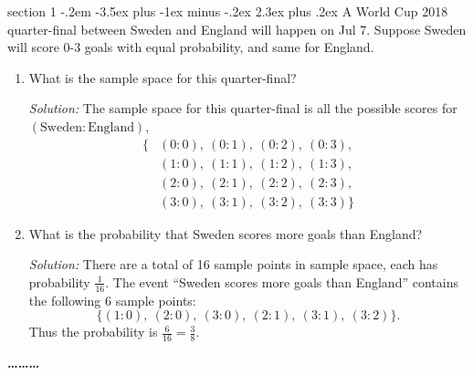 \documentclass[11pt]{article}
\makeatletter
\newenvironment{problem}{\@startsection
       {section}
       {1}
       {-.2em}
       {-3.5ex plus -1ex minus -.2ex}
       {2.3ex plus .2ex}
       {\pagebreak[3]%
       \large\bf\noindent{Problem }
       }
       }
       {%
       \begin{center}\large\bf \ldots\ldots\ldots\end{center}}
\makeatother
\begin{document}
\begin{problem}{}
A World Cup 2018 quarter-final between Sweden and England will happen on Jul 7. Suppose Sweden will score 0-3 goals with equal probability, and same for England. 
\begin{enumerate}
\item What is the sample space for this quarter-final?

\vspace{0.2cm}
\textit{Solution:} 
The sample space for this quarter-final is all the possible scores for $(\text{Sweden}:\text{England})$,
\begin{align*}
    \{ &(0:0),\  (0:1),\  (0:2),\  (0:3),\\
       &(1:0),\  (1:1),\  (1:2),\  (1:3),\\
       &(2:0),\  (2:1),\  (2:2),\  (2:3),\\
       &(3:0),\  (3:1),\  (3:2),\  (3:3) \}
\end{align*}
\item What is the probability that Sweden scores more goals than England? 

\vspace{0.2cm}
\textit{Solution:} 
There are a total of 16 sample points in sample space, each has probability $\frac{1}{16}$. The event ``Sweden scores more goals than England'' contains the following 6 sample points:
$$\{(1:0),\ (2:0),\ (3:0),\ (2:1),\ (3:1),\ (3:2)\}.$$
Thus the probability is $\frac{6}{16}=\frac{3}{8}$.


\end{enumerate}
\end{problem}
\end{document}
